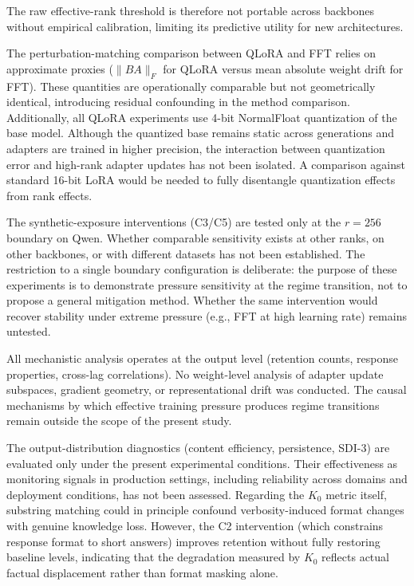 \documentclass[a4paper,fleqn]{cas-dc}
\begin{document}
\noindent The raw effective-rank threshold is
therefore not portable across backbones without empirical calibration, limiting
its predictive utility for new architectures.

The perturbation-matching comparison between QLoRA and FFT relies on approximate
proxies ($\|BA\|_F$ for QLoRA versus mean absolute weight drift for FFT). These
quantities are operationally comparable but not geometrically identical,
introducing residual confounding in the method comparison. Additionally, all
QLoRA experiments use 4-bit NormalFloat quantization of the base model. Although
the quantized base remains static across generations and adapters are trained in
higher precision, the interaction between quantization error and high-rank
adapter updates has not been isolated. A comparison against standard 16-bit LoRA
would be needed to fully disentangle quantization effects from rank effects.

The synthetic-exposure interventions (C3/C5) are tested only at the $r=256$
boundary on Qwen. Whether comparable sensitivity exists at other ranks, on other
backbones, or with different datasets has not been established. The restriction to a single boundary configuration is deliberate: the purpose of
these experiments is to demonstrate pressure sensitivity at the regime
transition, not to propose a general mitigation method. Whether the same
intervention would recover stability under extreme pressure (e.g., FFT at high
learning rate) remains untested.

All mechanistic analysis operates at the output level (retention counts, response
properties, cross-lag correlations). No weight-level analysis of adapter update
subspaces, gradient geometry, or representational drift was conducted. The causal
mechanisms by which effective training pressure produces regime transitions
remain outside the scope of the present study.

The output-distribution diagnostics (content efficiency, persistence, SDI-3) are
evaluated only under the present experimental conditions. Their effectiveness as
monitoring signals in production settings, including reliability across domains
and deployment conditions, has not been assessed. Regarding the $K_0$ metric
itself, substring matching could in principle confound verbosity-induced format
changes with genuine knowledge loss. However, the C2 intervention (which
constrains response format to short answers) improves retention without fully
restoring baseline levels, indicating that the degradation measured by $K_0$
reflects actual factual displacement rather than format masking alone.
\end{document}

